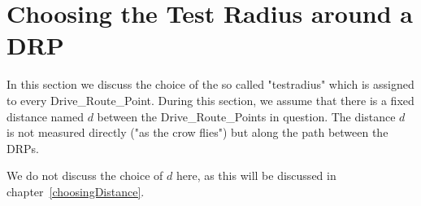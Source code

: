 \chapter{Choosing the Test Radius around a DRP}
\label{choosingATestradius}
In this section we discuss the choice of the so called "testradius" 
which is assigned to every Drive\_Route\_Point.
During this section, we assume that there is a fixed distance named $d$
between the Drive\_Route\_Points in question.
The distance $d$ is not measured directly ("as the crow flies") but 
along the path between the DRPs.

We do not discuss the choice of $d$ here, as this will be discussed in chapter~\ref{choosingDistance}.

%
%

%
%
%

